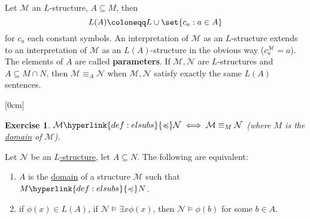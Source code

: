 \documentclass{article}
\let\models\vDash
\newtheorem{nexercise}[nthm]{Exercise}
\begin{document}
\begin{ndef}\label{def:3.6}
  Let $\mathcal{M}$ an $L$-structure, $A \subseteq M$, then
  \begin{equation*}
    L(A) \coloneqq L \cup \set{c_a : a \in A}
  \end{equation*}
  for $c_a$ each constant symbols.
  An interpretation of $\mathcal{M}$ as an $L$-structure extends to an interpretation of $\mathcal{M}$ as an $L(A)$-structure in the obvious way ($c_a^\mathcal{M} = a$).
  The elements of $A$ are called \textbf{parameters}.
  If $\mathcal{M}, \mathcal{N}$ are $L$-structures and $A \subseteq M \cap N$, then $\mathcal{M} \equiv_A \mathcal{N}$ when $\mathcal{M}, \mathcal{N}$ satisfy exactly the same $L(A)$ sentences.
\end{ndef}

[0cm]
\begin{nexercise}\label{ex:3.7}
  $\mathcal{M} \hyperlink{def:elsubs}{\preccurlyeq} \mathcal{N} \iff \mathcal{M} \equiv_M \mathcal{N}$ (where $M$ is the \hyperlink{def:lstr}{domain} of $\mathcal{M}$).
\end{nexercise}
\begin{nlemma}\label{lem:3.8}
  Let $\mathcal{N}$ be an \hyperlink{def:lstr}{$L$-structure}, let $A \subseteq N$. The following are equivalent:
  \begin{enumerate}[label=(\roman*)]
    \item $A$ is the \hyperlink{def:lstr}{domain} of a structure $\mathcal{M}$ such that $M \hyperlink{def:elsubs}{\preccurlyeq} N$.
    \item if $\phi(x) \in L(A)$, if $\mathcal{N} \models \exists x \phi(x)$, then $\mathcal{N} \models \phi(b)$ for some $b \in A$.
  \end{enumerate}
\end{nlemma}
\end{document}
